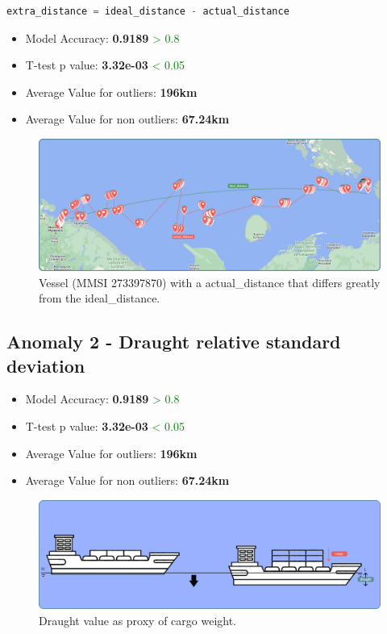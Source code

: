 \begin{lstlisting}[language=Python]
extra_distance = ideal_distance - actual_distance
\end{lstlisting}

\begin{itemize}
\item Model Accuracy: \textbf{0.9189} \textcolor{green}{> 0.8}
\item T-test p value: \textbf{3.32e-03} \textcolor{green}{< 0.05}
\item Average Value for outliers: \textbf{196km}
\item Average Value for non outliers: \textbf{67.24km}
\end{itemize}


\begin{figure}[H]
    \centering
    \includegraphics[width=16.5cm]{Images/3/anomaly-1.png}
    \caption{Vessel (MMSI 273397870) with a actual\_distance that differs greatly from the ideal\_distance.}
\end{figure}

\subsection{Anomaly 2 - Draught relative standard deviation}
\label{sec:anomaly-2}

\begin{itemize}
\item Model Accuracy: \textbf{0.9189} \textcolor{green}{> 0.8}
\item T-test p value: \textbf{3.32e-03} \textcolor{green}{< 0.05}
\item Average Value for outliers: \textbf{196km}
\item Average Value for non outliers: \textbf{67.24km}
\end{itemize}

\begin{figure}[H]
    \centering
    \includegraphics[width=16.5cm]{Images/3/anomaly-2.png}
    \caption{Draught value as proxy of cargo weight.}
\end{figure}

